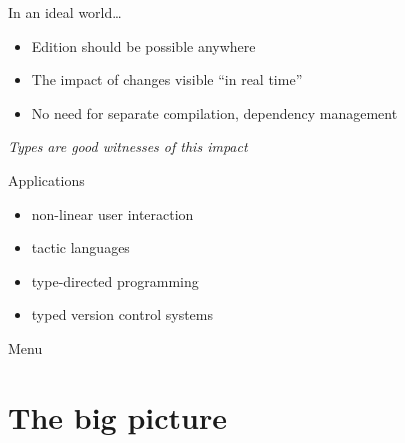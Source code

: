 \documentclass[ignorenonframetext,red]{beamer}
\begin{document}
\begin{frame}{In an ideal world\ldots}
  \begin{itemize}
  \item Edition should be possible anywhere
  \item The impact of changes visible “in real time”
  \item No need for separate compilation, dependency management
  \end{itemize}
  \pause
  \vspace{2em}
  \begin{center}
    {\large \it Types are good witnesses of this impact}
  \end{center}
  \vspace{1em}
  \pause
  \begin{block}{Applications}
    \begin{itemize}
    \item non-linear user interaction
    \item tactic languages
    \item type-directed programming
    \item typed version control systems
    \end{itemize}
  \end{block}
\end{frame}

\begin{frame}{Menu}
  \tableofcontents
\end{frame}

\section{The big picture}
\end{document}
